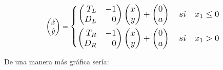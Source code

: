 \documentclass[12pt,a4paper]{report} %
\begin{document}
	\begin{equation}
		\begin{pmatrix*}[r]
			\dot{x} \\ \dot{y}
		\end{pmatrix*}=
		\label{eq:lienardrl}
		\scalebox{1.2}{$\displaystyle
			\left\{
			\begin{aligned}
				\begin{pmatrix*}[r]
					T_L & -1\\
					D_L & 0
				\end{pmatrix*}\begin{pmatrix*}[r]
					x \\ y
				\end{pmatrix*}+\begin{pmatrix}
					0\\a
				\end{pmatrix} \quad si \quad x_1\leq 0 \\
				\begin{pmatrix*}[r]
					T_R & -1\\
					D_R & 0
				\end{pmatrix*}\begin{pmatrix*}[r]
					x \\ y
				\end{pmatrix*}+\begin{pmatrix}
					0\\a
				\end{pmatrix} \quad si \quad x_1 > 0
			\end{aligned}
			\right. 
			$}
	\end{equation}\smallskip
	
	De una manera más gráfica sería:
	
\end{document}
